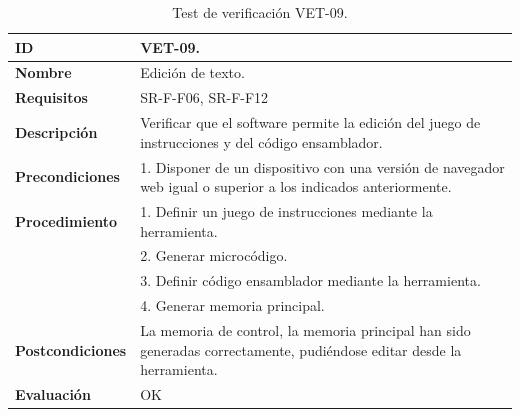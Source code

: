 \begin{center}
\begin{table}[htb]
\centering
\caption{Test de verificación VET-09.}
\begin{tabular}{@{}p{2.5cm} p{13cm}@{}} 
\toprule
\textbf{ID} 					& VET-09. \\
\midrule
\textbf{Nombre} 				& Edición de texto. \\
\midrule
\textbf{Requisitos} 		& SR-F-F06, SR-F-F12\\
\midrule
\textbf{Descripción} 		& Verificar que el software permite la edición del juego de instrucciones y del código ensamblador. \\
\midrule
\textbf{Precondiciones}		& 1. Disponer de un dispositivo con una versión de navegador web igual o superior a los indicados anteriormente. \\
\midrule
\textbf{Procedimiento}		& 1. Definir un juego de instrucciones mediante la herramienta.\\
											& 2. Generar microcódigo.\\
											& 3. Definir código ensamblador mediante la herramienta.\\
											& 4. Generar memoria principal.\\
\midrule
\textbf{Postcondiciones} 		&  La memoria de control, la memoria principal  han sido generadas correctamente, pudiéndose editar desde la herramienta.\\
\midrule
\textbf{Evaluación} 			& OK \\
\bottomrule
\end{tabular}
\label{tab:vet09}
\end{table}
\end{center}

